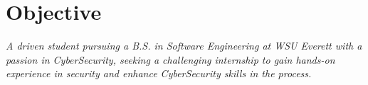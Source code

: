 \section{Objective}
\textit{A driven student pursuing a B.S. in Software Engineering at WSU Everett with a passion in CyberSecurity, seeking a challenging internship to gain hands-on experience in security and enhance CyberSecurity skills in the process. \\}
